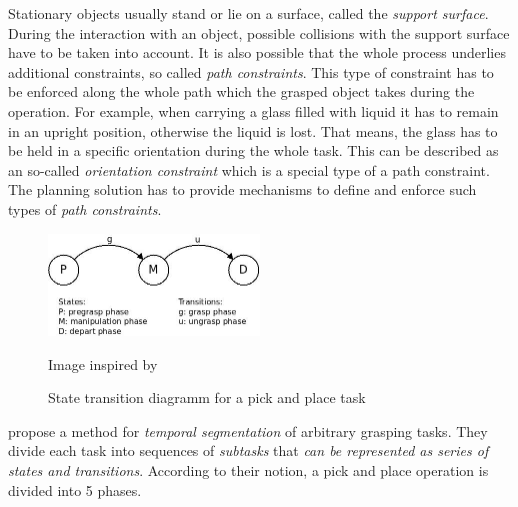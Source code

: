 Stationary objects usually stand or lie on a surface, called the \emph{support surface}. During the interaction with an object, possible collisions with the support surface have to be taken into account. It is also possible that the whole process underlies additional constraints, so called \emph{path constraints}. This type of constraint has to be enforced along the whole path which the grasped object takes during the operation. For example, when carrying a glass filled with liquid it has to remain in an upright position, otherwise the liquid is lost. That means, the glass has to be held in a specific orientation during the whole task. This can be described as an so-called \emph{orientation constraint} which is a special type of a path constraint. The planning solution has to provide mechanisms to define and enforce such types of \emph{path constraints}. \\

\begin{figure}[ht]
	\centering
  	\includegraphics[width=0.5\textwidth]{images/state_trans.jpg}
	\caption{State transition diagramm for a pick and place task}
	{\scriptsize Image inspired by \citep{kang1994}}
	\label{fig:state_trans}
\end{figure}

\citep{kang1994} propose a method for \emph{temporal segmentation} of arbitrary grasping tasks. They divide each task into sequences of \emph{subtasks} that \emph{can be represented as series of states and transitions}. According to their notion, a pick and place operation is divided into 5 phases.

